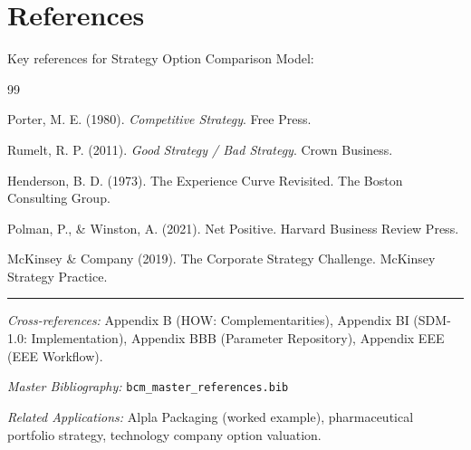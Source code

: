 \section{References}
\label{sec:socm-references}

Key references for Strategy Option Comparison Model:

\nocite{bcm_master}

\begin{thebibliography}{99}

 Porter, M. E. (1980). \textit{Competitive Strategy}. Free Press.

 Rumelt, R. P. (2011). \textit{Good Strategy / Bad Strategy}. Crown Business.

 Henderson, B. D. (1973). The Experience Curve Revisited. The Boston Consulting Group.

 Polman, P., \& Winston, A. (2021). Net Positive. Harvard Business Review Press.

 McKinsey \& Company (2019). The Corporate Strategy Challenge. McKinsey Strategy Practice.

\end{thebibliography}


\vspace{1em}
\hrule
\vspace{0.5em}

\noindent\textit{Cross-references:}
Appendix B (HOW: Complementarities),
Appendix BI (SDM-1.0: Implementation),
Appendix BBB (Parameter Repository),
Appendix EEE (EEE Workflow).

\noindent\textit{Master Bibliography:} \texttt{bcm\_master\_references.bib}

\noindent\textit{Related Applications:} Alpla Packaging (worked example), pharmaceutical portfolio strategy, technology company option valuation.

